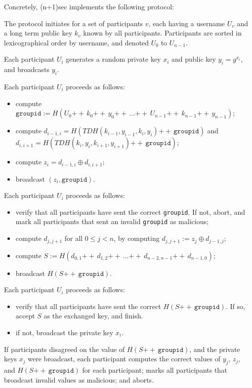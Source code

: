 \documentclass{article}
\def\concat{\mathbin{+\!\!\!+\,}}
\def\xor{\oplus}
\begin{document}
Concretely, (n+1)sec implements the following protocol:
\begin{description}[noitemsep]
\item[Participants.] The protocol initiates for a set of participants $v$, each having a username $U_v$ and a long term public key $k_v$ known by all participants. Participants are sorted in lexicographical order by username, and denoted $U_0$ to $U_{n-1}$.
\item[Round 1.] Each participant $U_i$ generates a random private key $x_i$ and public key $y_i = g^{x_i}$, and broadcasts $y_i$.
\item[Round 2.] Each participant $U_i$ proceeds as follows:
	\begin{itemize}[noitemsep,nolistsep]\renewcommand{\labelitemi}{--}
	\item compute $\texttt{groupid} := H(U_0 \concat k_0 \concat y_0 \concat \ldots \concat U_{n-1} \concat k_{n-1} \concat y_{n-1})$;
	\item compute $d_{i-1, i} = H(TDH(k_{i-1}, y_{i-1}, k_i, y_i) \concat \texttt{groupid})$ and $d_{i, i+1} = H(TDH(k_i, y_i, k_{i+1}, y_{i+1}) \concat \texttt{groupid})$;
	\item compute $z_i = d_{i-1, i} \xor d_{i, i+1}$;
	\item broadcast $(z_i, \texttt{groupid})$.
	\end{itemize}
\item[Round 3.] Each participant $U_i$ proceeds as follows:
	\begin{itemize}[noitemsep,nolistsep]\renewcommand{\labelitemi}{--}
	\item verify that all participants have sent the correct \texttt{groupid}. If not, abort, and mark all participants that sent an invalid \texttt{groupid} as malicious;
	\item compute $d_{j, j+1}$ for all $0 \leq j < n$, by computing $d_{j, j+1} := z_j \xor d_{j-1, j}$;
	\item compute $S := H(d_{0, 1} \concat d_{1, 2} \concat \ldots \concat d_{n-2, n-1} \concat d_{n-1, 0})$;
	\item broadcast $H(S \concat \texttt{groupid})$.
	\end{itemize}
\item[Round 4.] Each participant $U_i$ proceeds as follows:
	\begin{itemize}[noitemsep,nolistsep]\renewcommand{\labelitemi}{--}
	\item verify that all participants have sent the correct $H(S \concat \texttt{groupid})$. If so, accept $S$ as the exchanged key, and finish.
	\item if not, broadcast the private key $x_i$.
	\end{itemize}
\item[Aftermath.] If participants disagreed on the value of $H(S \concat \texttt{groupid})$, and the private keys $x_j$ were broadcast, each participant computes the correct values of $y_j$, $z_j$, and $H(S \concat \texttt{groupid})$ for each participant; marks all participants that broadcast invalid values as malicious; and aborts.
\end{description}
\end{document}
